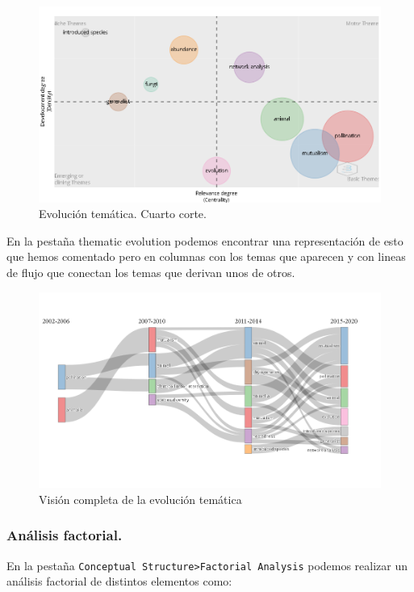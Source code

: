 \documentclass[
]{article}
\begin{document}
\begin{figure}
\centering
\includegraphics{ThematicEvolutionSlice4.png}
\caption{Evolución temática. Cuarto corte.}
\end{figure}

En la pestaña thematic evolution podemos encontrar una representación de
esto que hemos comentado pero en columnas con los temas que aparecen y
con lineas de flujo que conectan los temas que derivan unos de otros.

\begin{figure}
\centering
\includegraphics{ThematicEvolutionTotalView.png}
\caption{Visión completa de la evolución temática}
\end{figure}

\hypertarget{anuxe1lisis-factorial.}{%
\subsubsection{Análisis factorial.}\label{anuxe1lisis-factorial.}}

En la pestaña
\texttt{Conceptual\ Structure\textgreater{}Factorial\ Analysis} podemos
realizar un análisis factorial de distintos elementos como:
\end{document}
